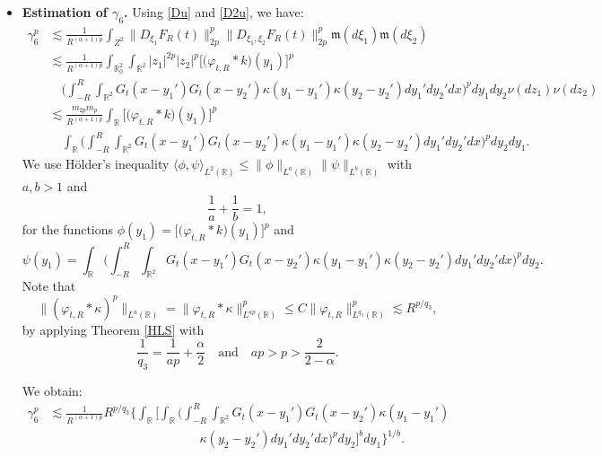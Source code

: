 \documentclass[12pt]{article}
\def\bR{\mathbb{R}}
\newcommand{\les}{\lesssim}
\def\k{\kappa}
\newcommand{\fm}{\mathfrak{m}}
\begin{document}
\begin{itemize}
\item {\bf Estimation of $\gamma_6$.} Using \eqref{Du} and \eqref{D2u}, we have:
\begin{align*}
\gamma_6^p & \les \frac{1}{R^{(\alpha+1)p}} \int_{Z^2} \|D_{\xi_1} F_R(t) \|_{2p}^p  \|D_{\xi_1,\xi_2} F_R(t)\|_{2p}^p \fm(d\xi_1) \fm(d\xi_2)\\
& \les \frac{1}{R^{(\alpha+1)p}} \int_{\bR_0^2} \int_{\bR^2} |z_1|^{2p} |z_2|^p \big[\big(\varphi_{t,R}*k\big)(y_1)\big]^p \\
& \quad \Big( \int_{-R}^R \int_{\bR^2} G_t(x-y_1')G_t(x-y_2') \k(y_1-y_1') \k(y_2-y_2') dy_1' dy_2' dx \Big)^p dy_1 dy_2 \nu(dz_1) \nu(dz_2)\\
& \les \frac{m_{2p} m_p}{R^{(\alpha+1)p}} \int_{\bR} \big[\big(\varphi_{t,R}*k\big)(y_1)\big]^p\\
& \quad \int_{\bR}  \Big( \int_{-R}^R \int_{\bR^2} G_t(x-y_1')G_t(x-y_2') \k(y_1-y_1') \k(y_2-y_2') dy_1' dy_2' dx \Big)^p dy_2 dy_1.
\end{align*}
We use H\"older's inequality $\langle \phi, \psi \rangle_{L^2(\bR)} \leq \|\phi\|_{L^a(\bR)} \|\psi\|_{L^b(\bR)}$ with $a,b>1$ and
\[
\frac{1}{a}+\frac{1}{b}=1,
\]
for the functions $\phi(y_1)=\big[ \big(\varphi_{t,R}*k\big)(y_1)\big]^p$ and
\[
\psi(y_1)= \int_{\bR}  \Big( \int_{-R}^R \int_{\bR^2} G_t(x-y_1')G_t(x-y_2') \k(y_1-y_1') \k(y_2-y_2') dy_1' dy_2' dx \Big)^p dy_2.
\]
Note that 
\[
\|(\varphi_{t,R}* \k)^p\|_{L^a(\bR)}=\|\varphi_{t,R}* \k\|_{L^{ap}(\bR)}^p \leq C \|\varphi_{t,R}\|_{L^{q_3}(\bR)}^p \les R^{p/q_3},
\]
by applying Theorem \ref{HLS} with 
\begin{equation}
\label{def-q3}
\frac{1}{q_3}=\frac{1}{ap}+\frac{\alpha}{2} \quad \mbox{and} \quad ap>p>\frac{2}{2-\alpha}.
\end{equation}


We obtain:
\begin{align*}
\gamma_6^p & \les \frac{1}{R^{(\alpha+1)p}} R^{p/q_3}\Bigg\{\int_{\bR}  \Bigg[ \int_{\bR}  \Big( \int_{-R}^R \int_{\bR^2} G_t(x-y_1')G_t(x-y_2') \k(y_1-y_1') \\
& \qquad \qquad \qquad \qquad \qquad \qquad \k(y_2-y_2') dy_1' dy_2' dx  \Big)^p dy_2 \Bigg]^b dy_1 \Bigg\}^{1/b}.
\end{align*}


\end{itemize}
\end{document}
